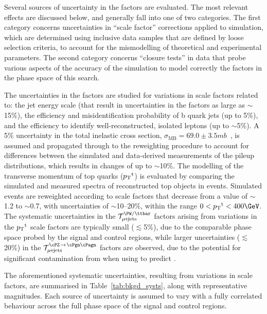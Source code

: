 Several sources of uncertainty in the \tf factors are evaluated.
The most relevant effects are discussed below, and generally fall into
one of two categories. The first category concerns uncertainties in
``scale factor'' corrections applied to simulation, which are
determined using inclusive data samples that are defined by loose
selection criteria, to account for the mismodelling of theoretical and
experimental parameters. The second category concerns ``closure
tests'' in data that probe various aspects of the accuracy of the
simulation to model correctly the \tf factors in the phase space
of this search.

The uncertainties in the \tf factors are studied for variations in
scale factors related to: the jet energy scale (that result in
uncertainties in the \tf factors as large as $\sim$15\%), the
efficiency and misidentification probability of b quark jets (up to
5\%), and the efficiency to identify well-reconstructed, isolated
leptons (up to $\sim$5\%). A 5\% uncertainty in the total inelastic
cross section, $\sigma_\text{MB} = 69.0 \pm
3.5\unit{mb}$~\cite{Aaboud:2016mmw}, is assumed and propagated through
to the reweighting procedure to account for differences between the
simulated and data-derived measurements of the pileup distributions,
which results in changes of up to $\sim$10\%. The modelling of the
transverse momentum of top quarks (${p_{\text T}}^\text{t}$) is evaluated by
comparing the simulated and measured \Pt spectra of reconstructed top
objects in \ttbar events.
Simulated events are reweighted according to scale factors that
decrease from a value of $\sim$1.2 to $\sim$0.7, with uncertainties of
$\sim$10--20\%, within the range $0 < \Pt^\text{t} < 400\GeV$.
The systematic uncertainties in the $\tf^\text{\PW/\ttbar}_{\mj}$
factors arising from variations in the ${p_{\text T}}^\text{t}$ scale factors
are typically small ($\lesssim$5\%), due to the comparable phase space
probed by the signal and control regions, while larger uncertainties
($\lesssim$20\%) in the $\tf^{\text{\znunu}}_{\mj}$ factors are
observed, due to the potential for significant contamination from
\ttbar when using \wlj to predict \znunuj.

The aforementioned systematic uncertainties, resulting from variations
in scale factors, are summarised in Table~\ref{tab:bkgd_systs}, along
with representative magnitudes.  Each source of uncertainty is assumed
to vary with a fully correlated behaviour across the full phase space
of the signal and control regions.

